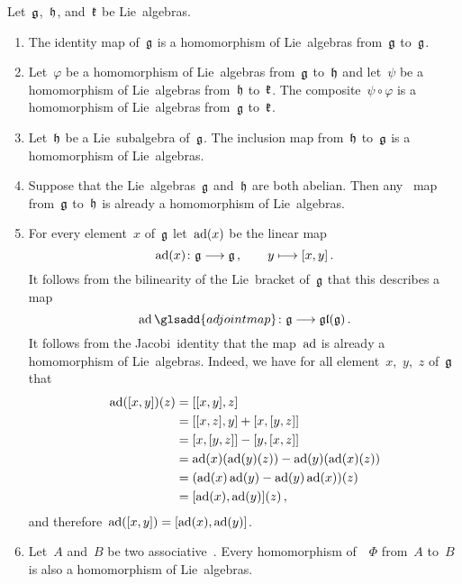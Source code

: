 \begin{examples}
	\label{homomorphisms of lie algebras}
	Let~$\mathfrak{g}$,~$\mathfrak{h}$, and~$\mathfrak{k}$ be Lie~algebras.
	\begin{enumerate}
		\item
			\label{identity is a homomorphism of lie algebras}
			The identity map of~$\mathfrak{g}$ is a homomorphism of Lie~algebras from~$\mathfrak{g}$ to~$\mathfrak{g}$.
		\item
			\label{composite of homomorphisms of lie algebras}
			Let~$\varphi$ be a homomorphism of Lie~algebras from~$\mathfrak{g}$ to~$\mathfrak{h}$ and let~$\psi$ be a homomorphism of Lie~algebras from~$\mathfrak{h}$ to~$\mathfrak{k}$.
			The composite~$\psi \circ \varphi$ is a homomorphism of Lie~algebras from~$\mathfrak{g}$ to~$\mathfrak{k}$.
		\item
			Let~$\mathfrak{h}$ be a Lie~subalgebra of~$\mathfrak{g}$.
			The inclusion map from~$\mathfrak{h}$ to~$\mathfrak{g}$ is a homomorphism of Lie~algebras.
		\item
			Suppose that the Lie~algebras~$\mathfrak{g}$ and~$\mathfrak{h}$ are both abelian.
			Then any~\linear{$\kf$} map from~$\mathfrak{g}$ to~$\mathfrak{h}$ is already a homomorphism of Lie~algebras.
		\item
			For every element~$x$ of~$\mathfrak{g}$ let~$\operatorname{ad}(x)$ be the linear map
			\[
				\ad(x)
				\colon
				\glie
				\to
				\glie \,,
				\qquad
				y
				\mapsto
				[x,y] \,.
				\index{adjoint representation}
			\]
			It follows from the bilinearity of the Lie~bracket of~$\mathfrak{g}$ that this describes a~\linear{$\kf$} map
			\[
				\ad
				\glsadd{adjoint map}
				\colon
				\glie
				\to
				\gllie(\glie) \,.
			\]
			It follows from the Jacobi~identity that the map~$\operatorname{ad}$ is already a homomorphism of Lie~algebras.
			Indeed, we have for all element~$x$,~$y$,~$z$ of~$\mathfrak{g}$ that
			\begin{align*}
					\operatorname{ad}([x,y])(z)
					&=
					[[x,y], z]
					\\
					&=
					[ [x,z], y ] + [ x, [y,z] ]
					\\
					&=
					[x,[y,z]] - [y,[x,z]]
					\\
					&=
					\operatorname{ad}(x)(\operatorname{ad}(y)(z)) - \operatorname{ad}(y)(\operatorname{ad}(x)(z))
					\\
					&=
					( \operatorname{ad}(x) \operatorname{ad}(y) - \operatorname{ad}(y) \operatorname{ad}(x) )(z)
					\\
					&=
					[\operatorname{ad}(x), \operatorname{ad}(y)](z) \,,
			\end{align*}
			and therefore~$\operatorname{ad}([x,y]) = [ \operatorname{ad}(x), \operatorname{ad}(y) ]$.
		\item
			\label{algebra homomorphisms are lie algebra homomorphisms}
			Let~$A$ and~$B$ be two associative~{\algebras{$\kf$}}.
			Every homomorphism of~{\algebras{$\kf$}}~$\Phi$ from~$A$ to~$B$ is also a homomorphism of Lie~algebras.

\end{enumerate}
\end{examples}
